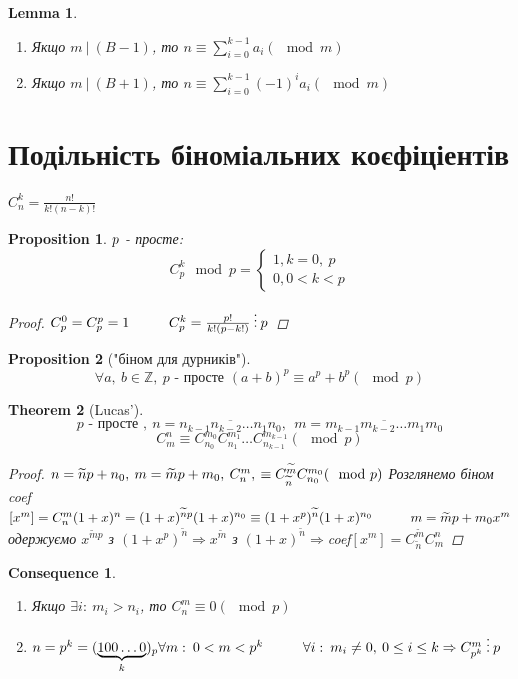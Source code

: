 \documentclass[a4paper,12pt, centered]{bookest}
\newtheorem{theorem}{Theorem}[section]
\newtheorem{lemma}[theorem]{Lemma}
\newtheorem*{prop*}{Proposition}
\newtheorem*{cons*}{Consequence}
\newcommand\tab[1][1cm]{\hspace*{#1}}
\begin{document}
\begin{lemma}$ $
	\begin{enumerate}
		\item Якщо $m\>|\>(B-1)$, то $n\equiv\sum\limits_{i=0}^{k-1}a_i(\mod m)$
		\item Якщо $m\>|\>(B+1)$, то $n\equiv\sum\limits_{i=0}^{k-1}(-1)^ia_i(\mod m)$
	\end{enumerate}
\end{lemma}
\section{Подільність біноміальних коєфіціентів}
$C_n^k=\frac{n!}{k!(n-k)!}$
\begin{prop*}
	$\\p$ - просте: $$C_p^k\mod p=\begin{cases}
		1, k=0,\>p\\0, 0<k<p
	\end{cases}$$
	\begin{proof}
		$\\C_p^0=C_p^p=1\tab C^k_p=\frac{p!}{k!(p-k!)}\>\vdots\>p$
	\end{proof}
\end{prop*}
\begin{prop*}["біном для дурників"]
	$$\forall a,\>b\in\mathbb{Z},\> p\textrm{ - просте }(a+b)^p\equiv a^p+b^p(\mod p)$$
\end{prop*}
\begin{theorem}[Lucas']
	$$ p\textrm{ - просте },\>n=\overline{n_{k-1}n_{k-2}\dots n_1n_0},\>\>m=\overline{m_{k-1}m_{k-2}\dots m_1m_0}$$
	$$C_m^n\equiv C^{m_0}_{n_0}C^{m_1}_{n_1}\dots C^{m_{k-1}}_{n_{k-1}}(\mod p)$$
	\begin{proof}
		$\\n=\widetilde{n}p+n_0,\>m=\widetilde{m}p+m_0,\>C^{m}_{n},\>\equiv C^{\widetilde{m}}_{\widetilde{n}}C^{m_0}_{n_0}(\mod p)\\$ Розглянемо біном \tab coef$[x^m]=C^m_n\\(1+x)^n=(1+x)^{\widetilde{n}p}(1+x)^{n_0}\equiv (1+x^p)^{\widetilde{n}}(1+x)^{n_0}\tab m=\widetilde{m}p+m_0\\x^m$ одержуємо $x^{\widetilde{m}p}$ з $(1+x^p)^{\widetilde{n}}\Rightarrow x^{\widetilde{m}}$ з $(1+x)^{\widetilde{n}}\Rightarrow$coef$[x^m]=C^{\widetilde{m}}_{\widetilde{n}}C_m^n$ 
	\end{proof}
\end{theorem}\newpage
\begin{cons*}$ $
	\begin{enumerate}
		\item Якщо $\exists i:\>m_i>n_i$, то $C_n^m\equiv 0(\mod p)$
		\item $n=p^k=(\underbrace{100\dots0}_{k})_p\\\forall m:\>0<m<p^k\tab \forall i:\>m_i\ne 0,\>0\leq i\leq k\Rightarrow C_{p^k}^{m}\>\vdots\>p$
	\end{enumerate}
\end{cons*}
\end{document}
